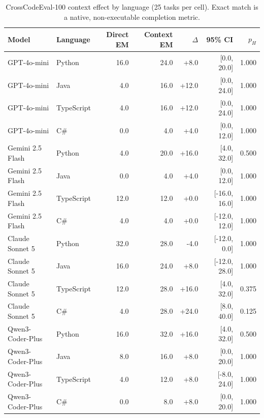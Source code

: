 \begin{table}[t]
\centering
\scriptsize
\caption{CrossCodeEval-100 context effect by language (25 tasks per cell). Exact match is a native, non-executable completion metric.}
\label{tab:cross_language_final}
\begin{tabular}{llrrrrr}
\toprule
Model & Language & Direct EM & Context EM & $\Delta$ & 95\% CI & $p_H$ \\
\midrule
GPT-4o-mini & Python & 16.0 & 24.0 & +8.0 & [0.0, 20.0] & 1.000 \\
GPT-4o-mini & Java & 4.0 & 16.0 & +12.0 & [0.0, 24.0] & 1.000 \\
GPT-4o-mini & TypeScript & 4.0 & 16.0 & +12.0 & [0.0, 24.0] & 1.000 \\
GPT-4o-mini & C\# & 0.0 & 4.0 & +4.0 & [0.0, 12.0] & 1.000 \\
\midrule
Gemini 2.5 Flash & Python & 4.0 & 20.0 & +16.0 & [4.0, 32.0] & 0.500 \\
Gemini 2.5 Flash & Java & 0.0 & 4.0 & +4.0 & [0.0, 12.0] & 1.000 \\
Gemini 2.5 Flash & TypeScript & 12.0 & 12.0 & +0.0 & [-16.0, 16.0] & 1.000 \\
Gemini 2.5 Flash & C\# & 4.0 & 4.0 & +0.0 & [-12.0, 12.0] & 1.000 \\
\midrule
Claude Sonnet 5 & Python & 32.0 & 28.0 & -4.0 & [-12.0, 0.0] & 1.000 \\
Claude Sonnet 5 & Java & 16.0 & 24.0 & +8.0 & [-12.0, 28.0] & 1.000 \\
Claude Sonnet 5 & TypeScript & 12.0 & 28.0 & +16.0 & [4.0, 32.0] & 0.375 \\
Claude Sonnet 5 & C\# & 4.0 & 28.0 & +24.0 & [8.0, 40.0] & 0.125 \\
\midrule
Qwen3-Coder-Plus & Python & 16.0 & 32.0 & +16.0 & [4.0, 32.0] & 0.500 \\
Qwen3-Coder-Plus & Java & 8.0 & 16.0 & +8.0 & [0.0, 20.0] & 1.000 \\
Qwen3-Coder-Plus & TypeScript & 4.0 & 12.0 & +8.0 & [-8.0, 24.0] & 1.000 \\
Qwen3-Coder-Plus & C\# & 0.0 & 8.0 & +8.0 & [0.0, 20.0] & 1.000 \\
\bottomrule
\end{tabular}
\end{table}
